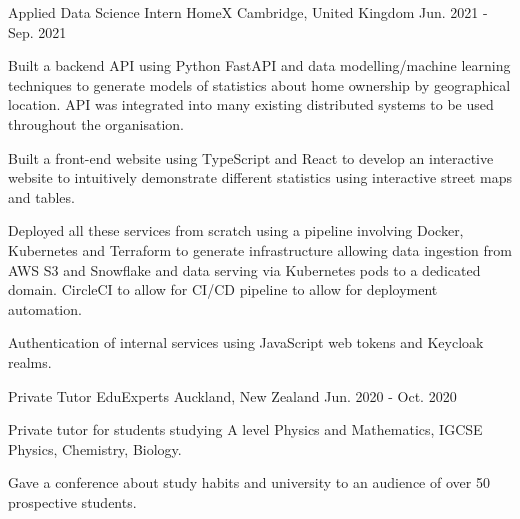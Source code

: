 

\begin{cventries}

  \cventry
    {Applied Data Science Intern} %
    {HomeX} %
    {Cambridge, United Kingdom} %
    {Jun. 2021 - Sep. 2021} %
    {
      \begin{cvitems} %
        \item {Built a backend API using Python FastAPI and data modelling/machine learning techniques to generate models of statistics about home ownership by geographical location. API was integrated into many existing distributed systems to be used throughout the organisation.}
        \item {Built a front-end website using TypeScript and React to develop an interactive website to intuitively demonstrate different statistics using interactive street maps and tables.}
        \item {Deployed all these services from scratch using a pipeline involving Docker, Kubernetes and Terraform to generate infrastructure allowing data ingestion from AWS S3 and Snowflake and data serving via Kubernetes pods to a dedicated domain. CircleCI to allow for CI/CD pipeline to allow for deployment automation.}
        \item {Authentication of internal services using JavaScript web tokens and Keycloak realms.}
      \end{cvitems}
    }

  \cventry
    {Private Tutor} %
    {EduExperts} %
    {Auckland, New Zealand} %
    {Jun. 2020 - Oct. 2020} %
    {
      \begin{cvitems} %
        \item {Private tutor for students studying A level Physics and Mathematics, IGCSE Physics, Chemistry, Biology.}
        \item {Gave a conference about study habits and university to an audience of over 50 prospective students.}
      \end{cvitems}
    }


\end{cventries}
